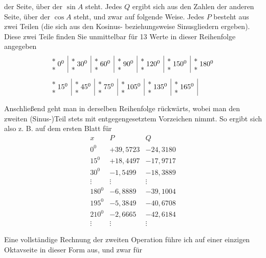 \begin{landscape}
der Seite, über der \(\sin A\) steht. Jedes \(Q\) ergibt sich aus den Zahlen der anderen Seite,
über der \(\cos A\) steht, und zwar auf folgende Weise. Jedes \(P\) besteht aus zwei Teilen
(die sich aus den Kosinus- beziehungsweise Sinusgliedern ergeben). Diese
zwei Teile finden Sie unmittelbar für 13 Werte in
dieser Reihenfolge angegeben
\providecommand{\VIIthreeStars}[1]{\begin{array}{@{}c@{}}\ast\\\ast\end{array}\;#1}
\begingroup\small
\[
\begin{aligned}
&\begin{array}{c|c|c|c|c|c|c}
\VIIthreeStars{0^0}&\VIIthreeStars{30^0}&\VIIthreeStars{60^0}&\VIIthreeStars{90^0}&\VIIthreeStars{120^0}&\VIIthreeStars{150^0}&\VIIthreeStars{180^0}
\end{array}\\[1ex]
&\begin{array}{c|c|c|c|c|c|}
\VIIthreeStars{15^0}&\VIIthreeStars{45^0}&\VIIthreeStars{75^0}&\VIIthreeStars{105^0}&\VIIthreeStars{135^0}&\VIIthreeStars{165^0}
\end{array}
\end{aligned}
\]
\endgroup
\par\noindent\hspace*{\parindent}Anschließend geht man in derselben Reihenfolge rückwärts, wobei man den zweiten
(Sinus-)Teil stets mit entgegengesetztem Vorzeichen nimmt. So ergibt sich also z. B.
auf dem ersten Blatt für
\[
\begin{array}{r|r|r}
x&P&Q\\
0^0&+39{,}5723&-24{,}3180\\
15^0&+18{,}4497&-17{,}9717\\
30^0&-1{,}5499&-18{,}3889\\
\vdots&\vdots&\vdots\\
180^0&-6{,}8889&-39{,}1004\\
195^0&-5{,}3849&-40{,}6708\\
210^0&-2{,}6665&-42{,}6184\\
\vdots&\vdots&\vdots
\end{array}
\]
\par\noindent Eine vollständige Rechnung der zweiten Operation führe ich auf einer einzigen Oktavseite
in dieser Form aus, und zwar für
\begingroup\renewcommand{\arraystretch}{1.8}\setlength{\tabcolsep}{13pt}
\begin{center}
\begin{tabular}{|c|c|c|c|c|c|}
\hline

\end{tabular}
\end{center}
\end{landscape}

